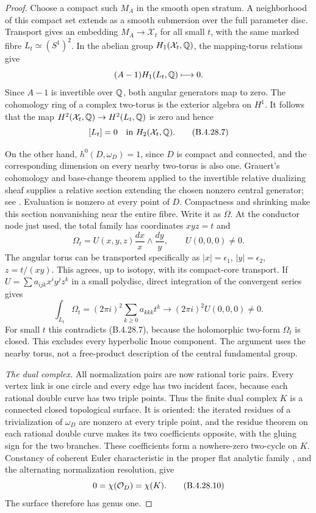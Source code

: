 \begin{proof}
Choose a compact such $M_A$ in the smooth open stratum.
A neighborhood of this compact set extends as a
smooth submersion over the full parameter disc.
Transport gives an embedding $M_A\to\mathcal X_t$ for
all small $t$, with the same marked fibre $L_t\simeq
(S^1)^2$. In the abelian group
$H_1(\mathcal X_t,\mathbb Q)$, the mapping-torus relations give
\[
 (A-1)H_1(L_t,\mathbb Q)\longmapsto0.
\]
Since $A-1$ is invertible over $\mathbb Q$, both angular
generators map to zero. The cohomology ring of a
complex two-torus is the exterior algebra on $H^1$.
It follows that the map $H^2(\mathcal X_t,\mathbb Q)\to
H^2(L_t,\mathbb Q)$ is zero and hence
\[
 [L_t]=0\quad\hbox{in }H_2(\mathcal X_t,\mathbb Q).           \tag{B.4.28.7}
\]

On the other hand, $h^0(D,\omega_D)=1$, since $D$ is
compact and connected, and the corresponding dimension
on every nearby two-torus is also one. Grauert's
cohomology and base-change theorem applied to the
invertible relative dualizing sheaf supplies a relative
section extending the chosen nonzero central generator;
see \citet[Chapter III, Theorem 4.12(ii)]{BS76push}.
Evaluation is
nonzero at every point of $D$. Compactness and shrinking
make this section nonvanishing near the entire fibre.
Write it as $\Omega$. At the conductor node just used,
the total family has coordinates $xyz=t$ and
\[
 \Omega_t=U(x,y,z)\frac{dx}{x}\wedge\frac{dy}{y},
 \qquad U(0,0,0)\ne0.                                \tag{B.4.28.8}
\]
The angular torus can be transported specifically as
$|x|=\epsilon_1$, $|y|=\epsilon_2$, $z=t/(xy)$.
This agrees, up to isotopy, with its compact-core
transport. If $U=\sum a_{ijk}x^iy^jz^k$ in a small
polydisc, direct integration of the convergent series
gives
\[
 \int_{L_t}\Omega_t
   =(2\pi i)^2\sum_{k\ge0}a_{kkk}t^k
   \longrightarrow(2\pi i)^2U(0,0,0)\ne0.            \tag{B.4.28.9}
\]
For small $t$ this contradicts (B.4.28.7), because
the holomorphic two-form $\Omega_t$ is closed. This
excludes every hyperbolic Inoue component. The
argument uses the nearby torus, not a free-product
description of the central fundamental group.

\emph{The dual complex.}
All normalization pairs are now rational toric pairs.
Every vertex link is one circle and every edge has
two incident faces, because each rational double
curve has two triple points. Thus the finite dual
complex $K$ is a connected closed topological surface.
It is oriented: the iterated residues of a
trivialization of $\omega_D$ are nonzero at every
triple point, and the residue theorem on each rational
double curve makes its two coefficients opposite,
with the gluing sign for the two branches. These
coefficients form a nowhere-zero two-cycle on $K$.
Constancy of coherent Euler characteristic in the
proper flat analytic family
\citep[Chapter III, Theorem 4.12(iii)]{BS76push}, and the alternating
normalization resolution, give
\[
 0=\chi(\mathcal O_D)=\chi(K).                              \tag{B.4.28.10}
\]
The surface therefore has genus one.


\end{proof}
